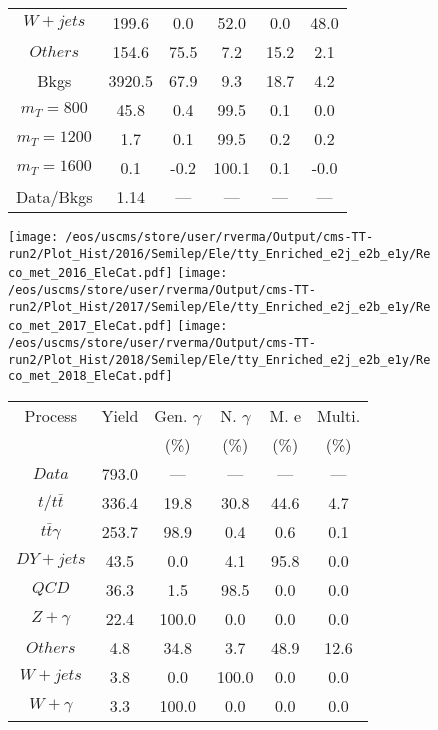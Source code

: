 \begin{figure}
\begin{minipage}[c]{0.32\textwidth}
{\begin{tabular}{cccccc}
$ W+jets $ &  199.6 &  0.0 &  52.0 &  0.0 &  48.0\\
$ Others $ &  154.6 &  75.5 &  7.2 &  15.2 &  2.1\\
Bkgs &  3920.5 &  67.9 &  9.3 &  18.7 &  4.2\\
$ m_{T} = 800 $ &  45.8 &  0.4 &  99.5 &  0.1 &  0.0\\
$ m_{T} = 1200 $ &  1.7 &  0.1 &  99.5 &  0.2 &  0.2\\
$ m_{T} = 1600 $ &  0.1 &  -0.2 &  100.1 &  0.1 &  -0.0\\
Data/Bkgs &  1.14 &  --- &  --- &  --- &  ---\\
\hline
\end{tabular}
}
\end{minipage}
\end{figure}

\begin{figure}
\centering
\texttt{[image: /eos/uscms/store/user/rverma/Output/cms-TT-run2/Plot\_Hist/2016/Semilep/Ele/tty\_Enriched\_e2j\_e2b\_e1y/Reco\_met\_2016\_EleCat.pdf]}
\texttt{[image: /eos/uscms/store/user/rverma/Output/cms-TT-run2/Plot\_Hist/2017/Semilep/Ele/tty\_Enriched\_e2j\_e2b\_e1y/Reco\_met\_2017\_EleCat.pdf]}
\texttt{[image: /eos/uscms/store/user/rverma/Output/cms-TT-run2/Plot\_Hist/2018/Semilep/Ele/tty\_Enriched\_e2j\_e2b\_e1y/Reco\_met\_2018\_EleCat.pdf]}
\begin{minipage}[c]{0.32\textwidth}
\centering
\tiny{
\begin{tabular}{cccccc}
\hline
Process & Yield & Gen. $\gamma$ & N. $\gamma$ & M. e & Multi. \\
 &  & (\%) & (\%) & (\%) & (\%)  \\
\hline
                                                                      $ Data $ &  793.0 &  --- &  --- &  --- &  ---\\
$ t/t\bar{t} $ &  336.4 &  19.8 &  30.8 &  44.6 &  4.7\\
$ t\bar{t}\gamma $ &  253.7 &  98.9 &  0.4 &  0.6 &  0.1\\
$ DY+jets $ &  43.5 &  0.0 &  4.1 &  95.8 &  0.0\\
$ QCD $ &  36.3 &  1.5 &  98.5 &  0.0 &  0.0\\
$ Z+\gamma $ &  22.4 &  100.0 &  0.0 &  0.0 &  0.0\\
$ Others $ &  4.8 &  34.8 &  3.7 &  48.9 &  12.6\\
$ W+jets $ &  3.8 &  0.0 &  100.0 &  0.0 &  0.0\\
$ W+\gamma $ &  3.3 &  100.0 &  0.0 &  0.0 &  0.0\\

\end{tabular}}
\end{minipage}
\end{figure}
